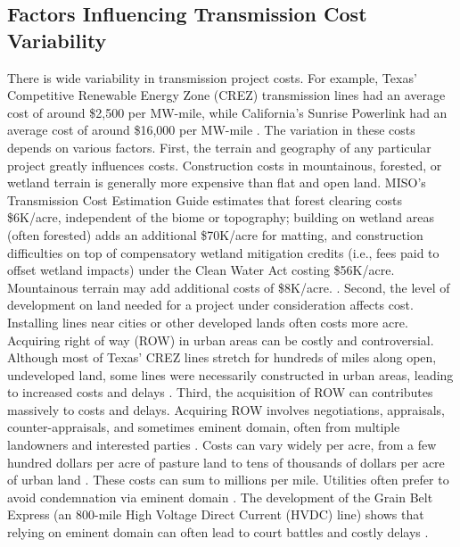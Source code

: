 \documentclass[11pt,twocolumn,a4paper]{article}
\begin{document}
\subsection{Factors Influencing Transmission Cost Variability}
There is wide variability in transmission project costs. For example, Texas' Competitive Renewable Energy Zone (CREZ) transmission lines had an average cost of around \$2,500 per MW-mile, while California's Sunrise Powerlink had an average cost of around \$16,000 per MW-mile \parencite{AndradeBaldick2017}. The variation in these costs depends on various factors. First, the terrain and geography of any particular project greatly influences costs. Construction costs in mountainous, forested, or wetland terrain is generally more expensive than flat and open land. MISO's Transmission Cost Estimation Guide estimates that forest clearing costs \$6K/acre, independent of the biome or topography; building on wetland areas (often forested) adds an additional \$70K/acre for matting, and construction difficulties on top of compensatory wetland mitigation credits (i.e., fees paid to offset wetland impacts) under the Clean Water Act costing \$56K/acre. Mountainous terrain may add additional costs of \$8K/acre. \parencite{MISO2024CostGuide}. Second, the level of development on land needed for a project under consideration affects cost. Installing lines near cities or other developed lands often costs more acre. Acquiring right of way (ROW) in urban areas can be costly and controversial. Although most of Texas' CREZ lines stretch for hundreds of miles along open, undeveloped land, some lines were necessarily constructed in urban areas, leading to increased costs and delays \parencite{AndradeBaldick2017}. Third, the acquisition of ROW can contributes massively to costs and delays. Acquiring ROW involves negotiations, appraisals, counter-appraisals, and sometimes eminent domain, often from multiple landowners and interested parties \parencite{IUB2021EminentDomainFAQ}. Costs can vary widely per acre, from a few hundred dollars per acre of pasture land to tens of thousands of dollars per acre of urban land \parencite{MISO2024CostGuide}. These costs can sum to millions per mile. Utilities often prefer to avoid condemnation via eminent domain \parencite{WI_DATCP_ROW}. The development of the Grain Belt Express (an 800-mile High Voltage Direct Current (HVDC) line) shows that relying on eminent domain can often lead to court battles and costly delays \parencite{Vanacker2021GrainBeltCondemnation}. 
\end{document}
